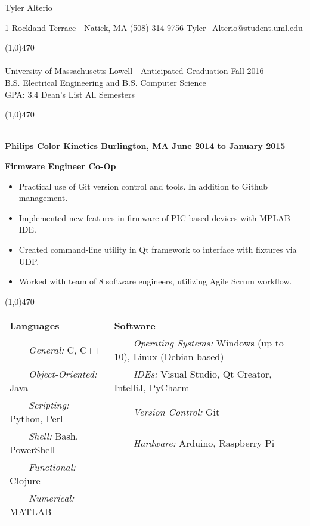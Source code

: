 \documentclass[11pt]{article} %
\newcommand{\tabitem}{~~\llap{\textbullet}~~}
\begin{document}
\centerline{\Huge \sc Tyler Alterio}

\centerline{
1 Rockland Terrace - Natick, MA \textbullet \hspace{1pt} (508)-314-9756 \textbullet \hspace{1pt} Tyler\_{}Alterio@student.uml.edu
}

\noindent \line(1,0){470}\\

\smallskip \\
University of Massachusetts Lowell - Anticipated Graduation Fall 2016 \\
B.S. Electrical Engineering and B.S. Computer Science \\
GPA: 3.4 \hspace{75pt} Dean's List All Semesters

\noindent \line(1,0){470}\\

\smallskip \\
\centerline{\bf Philips Color Kinetics \textbullet \hspace{1pt} Burlington, MA \hfill June 2014 to January 2015}
{\bf Firmware Engineer Co-Op}
\begin{itemize}
\itemsep0em
	\item Practical use of Git version control and tools. In addition to Github management.
	\item Implemented new features in firmware of PIC based devices with MPLAB IDE.
	\item Created command-line utility in Qt framework to interface with fixtures via UDP.
	\item Worked with team of 8 software engineers, utilizing Agile Scrum workflow.
\end{itemize}

\noindent \line(1,0){470}\\

 \smallskip
\vspace{-10pt}
\begin{center}
\begin{tabular}{l|l}
	{\bf Languages} & {\bf Software} \\
	\tabitem \textit{General:} C, C++ & \tabitem \textit{Operating Systems:} Windows (up to 10), Linux (Debian-based)\\
	\tabitem \textit{Object-Oriented:} Java & \tabitem \textit{IDEs:} Visual Studio, Qt Creator, IntelliJ, PyCharm\\
	\tabitem \textit{Scripting:} Python, Perl & \tabitem \textit{Version Control:} Git\\
	\tabitem \textit{Shell:} Bash, PowerShell & \tabitem \textit{Hardware:} Arduino, Raspberry Pi\\
	\tabitem \textit{Functional:} Clojure & ~\\
	\tabitem \textit{Numerical:} MATLAB & ~\\
\end{tabular}
\end{center}
\end{document}
